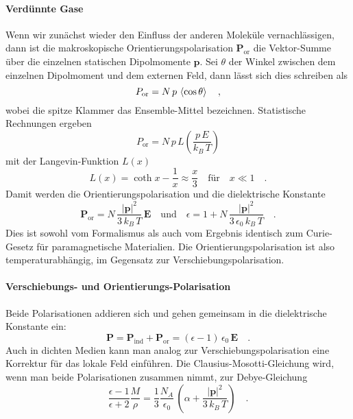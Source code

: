 \paragraph{Verdünnte Gase} Wenn wir zunächst wieder den Einfluss der anderen Moleküle vernachlässigen, dann ist die makroskopische Orientierungspolarisation $\mathbf{P}_\text{or}$ die Vektor-Summe über die einzelnen statischen Dipolmomente $ \mathbf{p}$. Sei $\theta$ der Winkel zwischen dem einzelnen Dipolmoment und dem externen Feld, dann lässt sich dies schreiben als
\begin{equation}
P_\text{or} = N \, p \, \braket{ \cos \theta}  \quad ,
\end{equation}
wobei die spitze Klammer das Ensemble-Mittel bezeichnen. Statistische Rechnungen ergeben
 \begin{equation}
P_\text{or} = N \, p \, L \left( \frac{p \, E}{k_B \, T} \right)
\end{equation}
mit der Langevin-Funktion $L(x)$
\begin{equation}
L(x) = \coth x - \frac{1}{x} \approx \frac{x}{3} \quad \text{für} \quad x \ll 1 \quad .
\end{equation}
Damit werden die Orientierungspolarisation und die dielektrische Konstante
\begin{equation}
\mathbf{P}_\text{or} = N \, \frac{|\mathbf{p} |^2}{3 \, k_B \, T} \, \mathbf{E}  \quad \text{und} \quad \epsilon = 1 + N \, \frac{|\mathbf{p} |^2}{3\, \epsilon_0 \, k_B \, T} \quad .
\end{equation}
Dies ist sowohl vom Formalismus als auch vom Ergebnis identisch zum Curie-Gesetz für paramagnetische Materialien. Die Orientierungspolarisation ist also temperaturabhängig, im Gegensatz zur Verschiebungspolarisation.

\paragraph{Verschiebungs- und Orientierungs-Polarisation} Beide Polarisationen addieren sich und gehen gemeinsam in die dielektrische Konstante ein:
\begin{equation}
\mathbf{P}  = \mathbf{P}_\text{ind} + \mathbf{P}_\text{or} = \left( \epsilon - 1 \right) \, \epsilon_0 \, \mathbf{E}  \quad .
\end{equation}
Auch in dichten Medien kann man analog zur Verschiebungspolarisation eine Korrektur für das lokale Feld einführen. Die Clausius-Mosotti-Gleichung wird, wenn man beide Polarisationen zusammen nimmt, zur Debye-Gleichung
 \begin{equation}
 \frac{\epsilon - 1}{\epsilon + 2} \frac{M}{\rho} = \frac{1}{3} \frac{N_A}{\epsilon
_0} \,  \left( \alpha  + \frac{|\mathbf{p} |^2}{3 \, k_B \, T}  \right) \quad .
 \end{equation}
 
